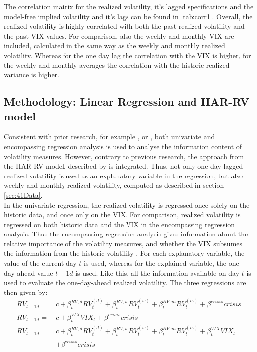 The correlation matrix for the realized volatility, it's lagged specifications and the model-free implied volatility and it's lags can be found in \ref{tab:corr1}. Overall, the realized volatility is highly correlated with both the past realized volatility and the past \ac{VIX} values. For comparison, also the weekly and monthly \ac{VIX} are included, calculated in the same way as the weekly and monthly realized volatility. Whereas for the one day lag the correlation with the \ac{VIX} is higher, for the weekly and monthly averages the correlation with the historic realized variance is higher. 

\subsection{Methodology: Linear Regression and HAR-RV model}\label{sec:42Method}
Consistent with prior research, for example \textcite{jiang2003}, \textcite{canina1993} or \textcite{christensen1998}, both univariate and encompassing regression analysis is used to analyse the information content of volatility measures. However, contrary to previous research, the approach from the HAR-RV model, described by \textcite{corsi2009} is integrated. Thus, not only one day lagged realized volatility is used as an explanatory variable in the regression, but also weekly and monthly realized volatility, computed as described in section \ref{sec:41Data}.\\
In the univariate regression, the realized volatility is regressed once solely on the historic data, and once only on the \ac{VIX}. For comparison, realized volatility is regressed on both historic data and the \ac{VIX} in the encompassing regression analysis. Thus the encompassing regression analysis gives information about the relative importance of the volatility measures, and whether the \ac{VIX} subsumes the information from the historic volatility \parencite{jiang2003}. For each explanatory variable, the value of the current day $t$ is used, whereas for the explained variable, the one-day-ahead value $t+1d$ is used. Like this, all the information available on day $t$ is used to evaluate the one-day-ahead realized volatility. The three regressions are then given by:
\begin{align}
RV_{t+1d} = \ &c + \beta^{RV,d}_{t} RV^{(d)}_{t} + \beta^{RV,w}_{t} RV^{(w)}_{t} + \beta^{RV,m}_{t} RV^{(m)}_{t} + \beta^{crisis} crisis \tag{Reg1a}  \label{eq:Reg1a}\\
RV_{t+1d} = \ &c + \beta^{VIX}_{t} VIX_{t} + \beta^{crisis} crisis  \tag{Reg2a}  \label{eq:Reg2a}\\
RV_{t+1d} = \ &c + \beta^{RV,d}_{t} RV^{(d)}_{t} + \beta^{RV,w}_{t} RV^{(w)}_{t} + \beta^{RV,m}_{t} RV^{(m)}_{t} + \beta^{VIX}_{t} VIX_{t}  \nonumber \\
& + \beta^{crisis} crisis  \tag{Reg3a}  \label{eq:Reg3a}
\end{align}

